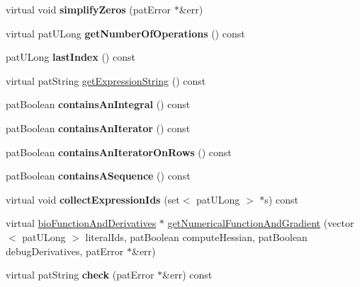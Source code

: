 \begin{DoxyCompactItemize}
\mbox{\label{classbio_arith_elem_aeb9f6d20f9802f29b22d94ca442f3015}} 
virtual void {\bfseries simplify\+Zeros} (pat\+Error $\ast$\&err)
\item 
\mbox{\label{classbio_arith_elem_af8eac0387ed4c5eaec6fdf0e48498770}} 
virtual pat\+U\+Long {\bfseries get\+Number\+Of\+Operations} () const
\item 
\mbox{\label{classbio_arith_elem_ab401b4ac4812ad95cda9d98b39fc1a8d}} 
pat\+U\+Long {\bfseries last\+Index} () const
\item 
virtual pat\+String \hyperlink{classbio_arith_elem_a0ea23c1cc50f06dec01ba195392c8417}{get\+Expression\+String} () const
\item 
\mbox{\label{classbio_arith_elem_a6080c51944897aae209c109fbde81d6a}} 
pat\+Boolean {\bfseries contains\+An\+Integral} () const
\item 
\mbox{\label{classbio_arith_elem_aa32c8faf83cdfb59f1d981046a0b5085}} 
pat\+Boolean {\bfseries contains\+An\+Iterator} () const
\item 
\mbox{\label{classbio_arith_elem_acc7b5c4774f9b131053717d1cb94654d}} 
pat\+Boolean {\bfseries contains\+An\+Iterator\+On\+Rows} () const
\item 
\mbox{\label{classbio_arith_elem_a0a3c0dd7f8d36f527b8da73390bd39b7}} 
pat\+Boolean {\bfseries contains\+A\+Sequence} () const
\item 
\mbox{\label{classbio_arith_elem_a29c15adab07861e48a20562cf57c38dc}} 
virtual void {\bfseries collect\+Expression\+Ids} (set$<$ pat\+U\+Long $>$ $\ast$s) const
\item 
virtual \hyperlink{classbio_function_and_derivatives}{bio\+Function\+And\+Derivatives} $\ast$ \hyperlink{classbio_arith_elem_a3aa76152765b0c8acb778f2070ded9f8}{get\+Numerical\+Function\+And\+Gradient} (vector$<$ pat\+U\+Long $>$ literal\+Ids, pat\+Boolean compute\+Hessian, pat\+Boolean debug\+Derivatives, pat\+Error $\ast$\&err)
\item 
\mbox{\label{classbio_arith_elem_ac6e02bb52b650db18e6ab66e36b2b557}} 
virtual pat\+String {\bfseries check} (pat\+Error $\ast$\&err) const
\end{DoxyCompactItemize}
